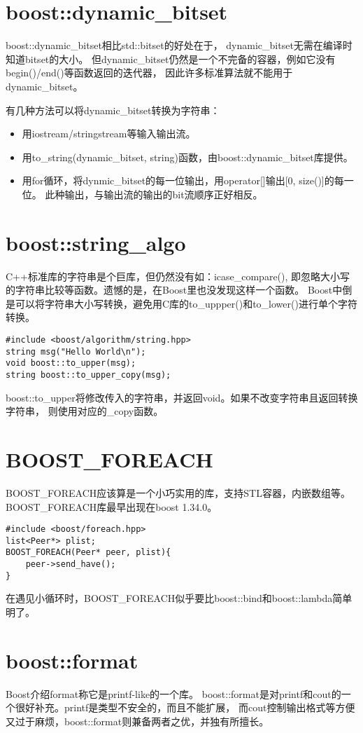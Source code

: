 \section{boost::dynamic\_bitset}
boost::dynamic\_bitset相比std::bitset的好处在于，
dynamic\_bitset无需在编译时知道bitset的大小。
但dynamic\_bitset仍然是一个不完备的容器，例如它没有begin()/end()等函数返回的迭代器，
因此许多标准算法就不能用于dynamic\_bitset。

有几种方法可以将dynamic\_bitset转换为字符串：
\begin{itemize}
\item 用iostream/stringstream等输入输出流。
\item 用to\_string(dynamic\_bitset, string)函数，由boost::dynamic\_bitset库提供。
\item 用for循环，将dynmic\_bitset的每一位输出，用operator[]输出[0, size()]的每一位。
此种输出，与输出流的输出的bit流顺序正好相反。
\end{itemize}

\section{boost::string\_algo}
C++标准库的字符串是个巨库，但仍然没有如：icase\_compare(),
即忽略大小写的字符串比较等函数。遗憾的是，在Boost里也没发现这样一个函数。
Boost中倒是可以将字符串大小写转换，避免用C库的to\_uppper()和to\_lower()进行单个字符转换。

\begin{lstlisting}
#include <boost/algorithm/string.hpp>
string msg("Hello World\n");
void boost::to_upper(msg);
string boost::to_upper_copy(msg);
\end{lstlisting}
boost::to\_upper将修改传入的字符串，并返回void。如果不改变字符串且返回转换字符串，
则使用对应的\_copy函数。

\section{BOOST\_FOREACH}
BOOST\_FOREACH应该算是一个小巧实用的库，支持STL容器，内嵌数组等。
BOOST\_FOREACH库最早出现在boost 1.34.0。

\begin{lstlisting}
#include <boost/foreach.hpp>
list<Peer*> plist;
BOOST_FOREACH(Peer* peer, plist){
    peer->send_have();
}
\end{lstlisting}
在遇见小循环时，BOOST\_FOREACH似乎要比boost::bind和boost::lambda简单明了。

\section{boost::format}
Boost介绍format称它是printf-like的一个库。
boost::format是对printf和cout的一个很好补充。printf是类型不安全的，而且不能扩展，
而cout控制输出格式等方便又过于麻烦，boost::format则兼备两者之优，并独有所擅长。

